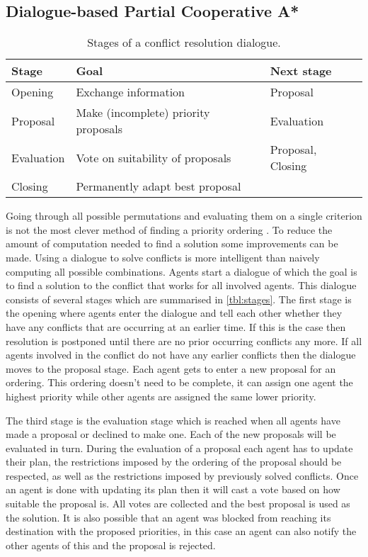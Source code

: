 \subsection{Dialogue-based Partial Cooperative A*}
\begin{table}
    \centering
    \caption{Stages of a conflict resolution dialogue.}
    \label{tbl:stages}
    \begin{tabular}{l|l|l}
        Stage & Goal & Next stage \\ \hline
        Opening & Exchange information & Proposal \\
        Proposal & Make (incomplete) priority proposals & Evaluation \\
        Evaluation & Vote on suitability of proposals & Proposal, Closing \\
        Closing & Permanently adapt best proposal & \\
    \end{tabular}
\end{table}

Going through all possible permutations and evaluating them on a single
criterion is not the most
clever method of finding a priority ordering \cite{bennewitz2002}. To reduce
the amount of computation needed to find a solution some improvements can be
made. Using a dialogue to solve conflicts is more intelligent than naively
computing all possible combinations. Agents start a dialogue of which the goal
is to find a solution to the conflict that works for all involved agents. This
dialogue consists of several stages which are summarised in
\autoref{tbl:stages}. The first stage is the opening where agents enter the
dialogue and tell each other whether they have any conflicts that are occurring
at an earlier time. If this is the case then resolution is postponed until
there are  no prior occurring conflicts any more. If all agents involved in the
conflict do not have any
earlier conflicts then the dialogue moves to the proposal stage. Each agent
gets to enter a new proposal for an ordering. This ordering doesn't need to be
complete, it can assign one agent the highest priority while other agents are
assigned the same lower priority.

The third stage is the evaluation stage which is reached when all agents have
made a proposal or declined to make one. Each of the new proposals will be
evaluated in turn. During the evaluation of a proposal each agent has to update
their plan, the restrictions imposed by the ordering of the proposal should be
respected, as well as the restrictions imposed by previously solved conflicts.
Once an
agent is done with updating its plan then it will cast a vote based on how
suitable the proposal is. All votes are collected and the best proposal is
used as the solution. It is also possible that an agent was blocked from
reaching its destination with the proposed priorities, in this case an agent
can also notify the other agents of this and the proposal is rejected.

